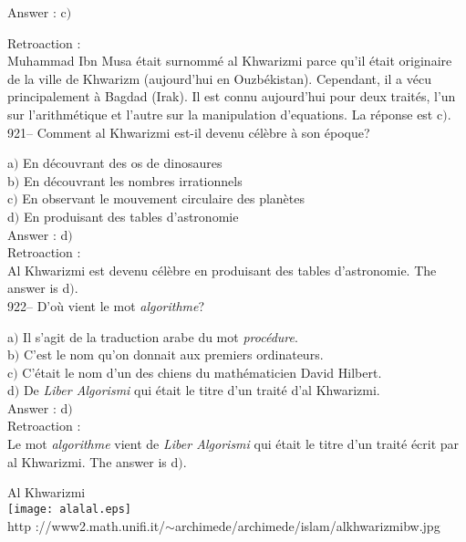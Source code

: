 ﻿\documentclass[letterpaper, 12pt]{article}
\begin{document}
Answer : c$)$\

Retroaction : \\
Muhammad Ibn Musa \'etait surnomm\'e al Khwarizmi parce qu'il
\'etait originaire de la ville de Khwarizm (aujourd'hui en
Ouzb\'ekistan). Cependant, il a v\'ecu principalement \`a Bagdad
(Irak). Il est connu aujourd'hui pour deux trait\'es,
l'un sur l'arithm\'etique et l'autre sur la manipulation d'equations. La
r\'eponse est c$)$.\\

921-- Comment al Khwarizmi est-il devenu c\'el\`ebre \`a son
\'epoque?

a$)$ En d\'ecouvrant des os de dinosaures \\
b$)$ En d\'ecouvrant les nombres irrationnels \\
c$)$ En observant le mouvement circulaire des plan\`etes \\
d$)$ En produisant des tables d'astronomie \\

Answer : d$)$\\

Retroaction : \\
Al Khwarizmi est devenu c\'el\`ebre en produisant des tables d'astronomie.
The answer is d$)$.\\

922-- D'o\`u vient le mot {\sl algorithme}?

a$)$ Il s'agit de la traduction arabe du mot {\sl proc\'edure}. \\
b$)$ C'est le nom qu'on donnait aux premiers ordinateurs. \\
c$)$ C'\'etait le nom d'un des chiens du math\'ematicien David Hilbert. \\
d$)$ De {\sl Liber Algorismi} qui \'etait le titre d'un trait\'e d'al
Khwarizmi. \\

Answer : d$)$\\

Retroaction :\\
Le mot {\sl algorithme} vient de {\sl Liber Algorismi} qui \'etait le titre
d'un trait\'e \'ecrit par al Khwarizmi. The answer is d$)$.\\

        \begin{center}
        Al Khwarizmi\\
    \texttt{[image: alalal.eps]}\\
        {\footnotesize http
://www2.math.unifi.it/$\sim$archimede/archimede/islam/alkhwarizmibw.jpg}
    \end{center}
\end{document}
